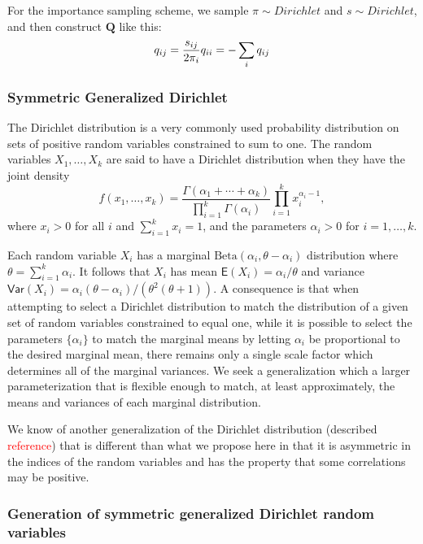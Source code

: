 \documentclass[useAMS,usenatbib]{biom}
\newcommand{\falta}[1]{\textcolor{red}{#1}}
\begin{document}
For the importance sampling scheme, we sample $\pi\sim Dirichlet$ and
$s\sim Dirichlet$, and then construct $\mathbf{Q}$ like this:
\begin{equation}
q_{ij} = \frac{s_{ij}}{2\pi_i} \\
q_{ii} = -\sum_i q_{ij}
\end{equation}

\subsubsection{Symmetric Generalized Dirichlet}
The Dirichlet distribution is a very commonly used probability distribution
on sets of positive random variables constrained to sum to one.
The random variables $X_1,\ldots,X_k$ are said to have a Dirichlet distribution
when they have the joint density
\begin{equation}
f(x_1,\ldots,x_k) = \frac{\Gamma(\alpha_1 + \cdots + \alpha_k)}{\prod_{i=1}^k \Gamma(\alpha_i)} \prod_{i=1}^k x_i^{\alpha_i - 1},
\end{equation}
where $x_i > 0$ for all $i$ and $\sum_{i=1}^k x_i = 1$, and the
parameters $\alpha_i > 0$ for $i=1,\ldots,k$.

Each random variable $X_i$ has a marginal
$\text{Beta}(\alpha_i,\theta-\alpha_i)$ distribution where $\theta =
\sum_{i=1}^k \alpha_i$.  It follows that $X_i$ has mean
$\mathsf{E}(X_i) = \alpha_i/\theta$ and variance $\mathsf{Var}(X_i) =
\alpha_i(\theta-\alpha_i) / ( \theta^2(\theta+1) )$.  A consequence is
that when attempting to select a Dirichlet distribution to match the
distribution of a given set of random variables constrained to equal
one, while it is possible to select the parameters $\{\alpha_i\}$ to
match the marginal means by letting $\alpha_i$ be proportional to the
desired marginal mean, there remains only a single scale factor which
determines all of the marginal variances.  We seek a generalization
which a larger parameterization that is flexible enough to match, at
least approximately, the means and variances of each marginal
distribution.

We know of another generalization of the Dirichlet distribution
(described \falta{reference}) that is different than what we propose
here in that it is asymmetric in the indices of the random variables
and has the property that some correlations may be positive.

\subsubsection{Generation of symmetric generalized Dirichlet random variables}
\end{document}
